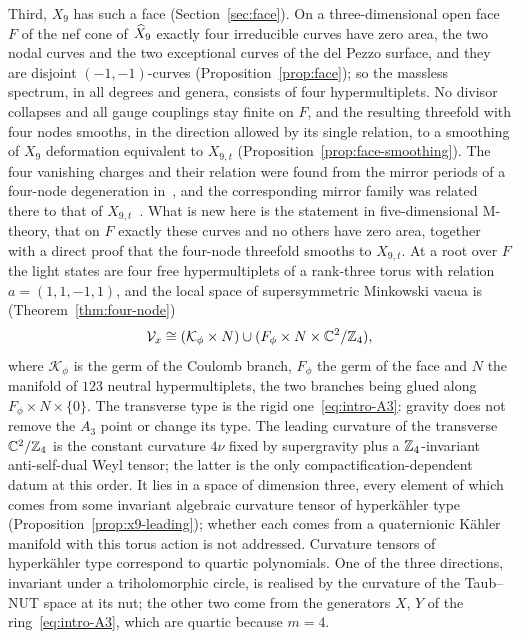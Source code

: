Third, $X_9$ has such a face (Section~\ref{sec:face}). On a three-dimensional open face $F$ of
the nef cone of $\widehat X_9$ exactly four irreducible curves have zero area, the two nodal curves and
the two exceptional curves of the del Pezzo surface, and they are disjoint $(-1,-1)$-curves
(Proposition~\ref{prop:face}); so the massless spectrum, in all degrees and genera, consists of four
hypermultiplets. No divisor collapses and all gauge couplings stay finite on $F$,
and the resulting threefold with four nodes smooths, in the direction allowed by its single
relation, to a smoothing of $X_9$ deformation equivalent to $X_{9,t}$
(Proposition~\ref{prop:face-smoothing}). The four vanishing charges and their relation were
found from the mirror periods of a four-node degeneration in~\cite[Sects.~5.1--5.2,
Prop.~5.1]{W26quantum}, and the corresponding mirror family was related there to that of
$X_{9,t}$~\cite[Prop.~5.2]{W26quantum}. What is new here is the statement in
five-dimensional M-theory, that on $F$ exactly these curves and no others have zero area, together with a
direct proof that the four-node threefold smooths to $X_{9,t}$. At a root over $F$ the light
states are four free hypermultiplets of a rank-three torus with relation $a=(1,1,-1,1)$, and
the local space of supersymmetric Minkowski vacua is (Theorem~\ref{thm:four-node})
\begin{equation}
 \mathcal V_x\cong(\mathcal K_\phi\times N)\cup(F_\phi\times N\times\mathbb C^2/\mathbb Z_4),
 \label{eq:intro-main}
\end{equation}
where $\mathcal K_\phi$ is the germ of the Coulomb branch, $F_\phi$ the germ of the face and $N$
the manifold of $123$ neutral hypermultiplets, the two branches being glued along
$F_\phi\times N\times\{0\}$. The transverse type is the rigid one~\eqref{eq:intro-A3}: gravity
does not remove the $A_3$ point or change its type. The leading curvature of the transverse $\mathbb C^2/\mathbb Z_4$ is the constant curvature $4\nu$ fixed by
supergravity plus a $\mathbb Z_4$-invariant anti-self-dual Weyl tensor; the latter is the only
compactification-dependent datum at this order. It lies in a space of dimension three, every element of
which comes from some invariant algebraic curvature tensor of hyperk\"ahler type
(Proposition~\ref{prop:x9-leading}); whether each comes from a quaternionic K\"ahler manifold with this
torus action is not addressed. Curvature tensors of hyperk\"ahler type correspond to quartic
polynomials. One of the three directions, invariant under a triholomorphic circle, is realised
by the curvature of the Taub--NUT space at its nut; the other two come from the generators $X$, $Y$
of the ring~\eqref{eq:intro-A3}, which are quartic because $m=4$.


